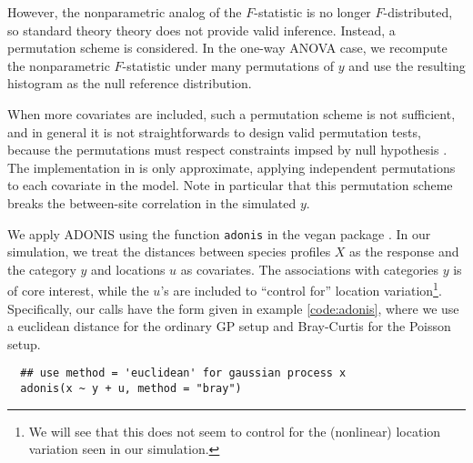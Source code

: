 \documentclass{article}
\newenvironment{code}{\captionsetup{type=listing}}{}
\begin{document}
However, the nonparametric analog of the $F$-statistic is no longer
$F$-distributed, so standard theory theory does not provide valid inference.
Instead, a permutation scheme is considered. In the one-way ANOVA case, we
recompute the nonparametric $F$-statistic under many permutations of $y$ and use
the resulting histogram as the null reference distribution.

When more covariates are included, such a permutation scheme is not sufficient,
and in general it is not straightforwards to design valid permutation tests,
because the permutations must respect constraints impsed by null hypothesis
\cite{anderson2001new}. The implementation in \citep{oksanen2007vegan} is only
approximate, applying independent permutations to each covariate in the model.
Note in particular that this permutation scheme breaks the between-site
correlation in the simulated $y$.




We apply ADONIS using the function \texttt{adonis} in the vegan package
\citep{oksanen2007vegan}. In our simulation, we treat the distances between
species profiles $X$ as the response and the category $y$ and locations $u$ as
covariates. The associations with categories $y$ is of core interest, while the
$u$'s are included to ``control for'' location variation\footnote{We will see
  that this does not seem to control for the (nonlinear) location variation seen
  in our simulation.}. Specifically, our calls have the form given in example
\ref{code:adonis}, where we use a euclidean distance for the ordinary GP setup
and Bray-Curtis for the Poisson setup.

\begin{code}
\begin{verbatim}
  ## use method = 'euclidean' for gaussian process x
  adonis(x ~ y + u, method = "bray")
\end{verbatim}
\label{code:adonis}
\end{code}
\end{document}
